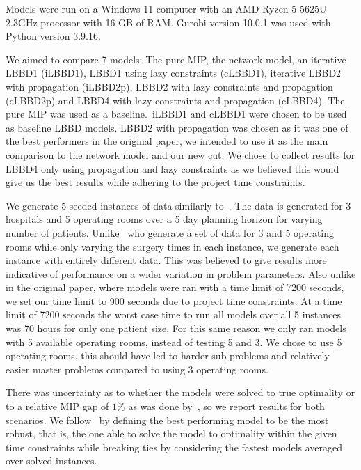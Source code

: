 Models were run on a Windows 11 computer with an AMD Ryzen 5 5625U 2.3GHz processor with 16 GB of RAM\@. Gurobi version 10.0.1 was used with Python version 3.9.16. 

We aimed to compare 7 models: The pure MIP, the network model, an iterative LBBD1 (iLBBD1), LBBD1 using lazy constraints (cLBBD1), iterative LBBD2 with propagation (iLBBD2p), LBBD2 with lazy constraints and propagation (cLBBD2p) and LBBD4 with lazy constraints and propagation (cLBBD4). The pure MIP was used as a baseline.\ iLBBD1 and cLBBD1  were chosen to be used as baseline LBBD models. LBBD2 with propagation was chosen as it was one of the best performers in the original paper, we intended to use it as the main comparison to the network model and our new cut. We chose to collect results for LBBD4 only using propagation and lazy constraints as we believed this would give us the best results while adhering to the project time constraints.

We generate 5 seeded instances of data similarly to~\cite{roshanaei2017propagating}. The data is generated for 3 hospitals and 5 operating rooms over a 5 day planning horizon for varying number of patients. Unlike~\cite{roshanaei2017propagating} who generate a set of data for 3 and 5 operating rooms while only varying the surgery times in each instance, we generate each instance with entirely different data. This was believed to give results more indicative of performance on a wider variation in problem parameters. Also unlike in the original paper, where models were ran with a time limit of 7200 seconds, we set our time limit to 900 seconds due to project time constraints. At a time limit of 7200 seconds the worst case time to run all models over all 5 instances was 70 hours for only one patient size. For this same reason we only ran models with 5 available operating rooms, instead of testing 5 and 3. We chose to use 5 operating rooms, this should have led to harder sub problems and relatively easier master problems compared to using 3 operating rooms\cite{roshanaei2017propagating}. 

There was uncertainty as to whether the models were solved to true optimality or to a relative MIP gap of $1\%$ as was done by~\cite{guo}, so we report results for both scenarios. We follow~\cite{roshanaei2017propagating} by defining the best performing model to be the most robust, that is, the one able to solve the model to optimality within the given time constraints while breaking ties by considering the fastest models averaged over solved instances.

